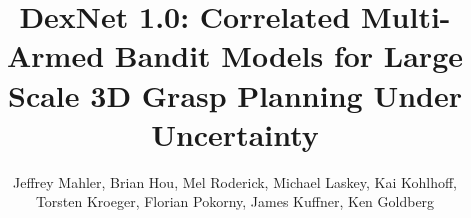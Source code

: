 \documentclass[letterpaper, 10 pt, conference]{ieeeconf}  %
\begin{document}
\title{\LARGE \bf DexNet 1.0: Correlated Multi-Armed Bandit Models for Large Scale 3D Grasp Planning Under Uncertainty
		}
\author{Jeffrey Mahler, Brian Hou, Mel Roderick, Michael Laskey, Kai Kohlhoff, \\ Torsten Kroeger, Florian Pokorny, James Kuffner, Ken Goldberg}
\maketitle



%


%



%

%

%



\end{document}

